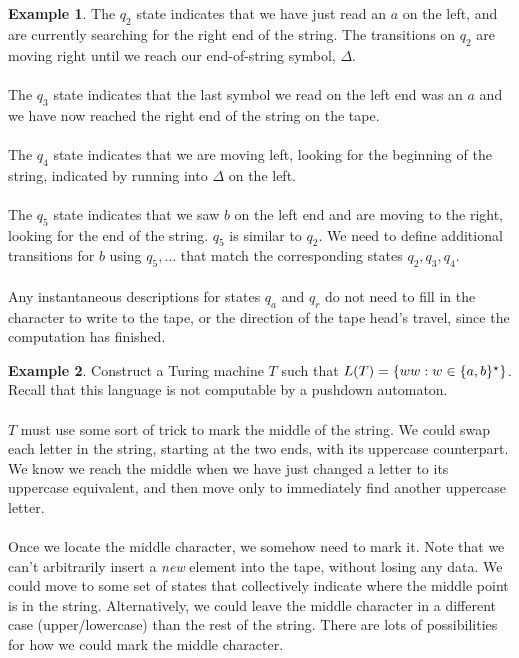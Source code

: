 \documentclass[]{article}
\DeclarePairedDelimiter{\set}{\lbrace}{\rbrace}
\theoremstyle{definition}
\newtheorem{ex}{Example}[section]
\begin{document}
\begin{ex}
      The $q_2$ state indicates that we have just read an $a$ on the left, and are currently searching for the right end of the string. The transitions on $q_2$ are moving right until we reach our end-of-string symbol, $\Delta$.
      \\ \\
      The $q_3$ state indicates that the last symbol we read on the left end was an $a$ and we have now reached the right end of the string on the tape.
      \\ \\
      The $q_4$ state indicates that we are moving left, looking for the beginning of the string, indicated by running into $\Delta$ on the left.
      \\ \\
      The $q_5$ state indicates that we saw $b$ on the left end and are moving to the right, looking for the end of the string. $q_5$ is similar to $q_2$. We need to define additional transitions for $b$ using $q_5, \ldots$ that match the corresponding states $q_2, q_3, q_4$.
      \\ \\
      Any instantaneous descriptions for states $q_a$ and $q_r$ do not need to fill in the character to write to the tape, or the direction of the tape head's travel, since the computation has finished.
    \end{ex}

    \begin{ex}
      Construct a Turing machine $T$ such that $L(T) = \set{ ww : w \in \set{a, b}^\star }$. Recall that this language is not computable by a pushdown automaton.
      \\ \\
      $T$ must use some sort of trick to mark the middle of the string. We could swap each letter in the string, starting at the two ends, with its uppercase counterpart. We know we reach the middle when we have just changed a letter to its uppercase equivalent, and then move only to immediately find another uppercase letter.
      \\ \\
      Once we locate the middle character, we somehow need to mark it. Note that we can't arbitrarily insert a \emph{new} element into the tape, without losing any data. We could move to some set of states that collectively indicate where the middle point is in the string. Alternatively, we could leave the middle character in a different case (upper/lowercase) than the rest of the string. There are lots of possibilities for how we could mark the middle character.
    \end{ex}
\end{document}
